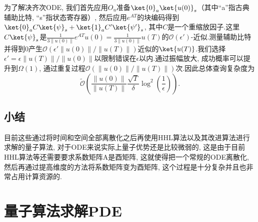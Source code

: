 为了解决齐次ODE, 我们首先应用$O_u$准备$\ket{0}_a\ket{u(0)}_s$（其中“a”指古典辅助比特, “s”指状态寄存器）, 然后应用$e^{AT}$的块编码得到$\ket{0}_a C \ket{\psi}_s + \ket{1}_a C' \ket{\psi'}_s$, 其中$C$是一个重缩放因子.这里$C \ket{\psi}_s$是$\frac{1}{3\|u(0)\|}e^{AT}u(0) = \frac{1}{3\|u(0)\|}u(T)$的$\mathcal{O}(\epsilon')$-近似.测量辅助比特并得到$0$产生$\mathcal{O}(\epsilon'\|u(0)\|/\|u(T)\|)$近似的$\ket{u(T)}$.我们选择$\epsilon' = \epsilon \|u(T)\|/\|u(0)\|$以限制错误在$\epsilon$以内.通过振幅放大, 成功概率可以提升到$\Omega(1)$, 通过重复过程$\mathcal{O}(\|u(0)\|/\|u(T)\|)$次.因此总体查询复杂度为
\begin{equation}
	\widetilde{\mathcal{O}}\left(\frac{\|u(0)\|}{\|u(T)\|} \frac{\sqrt{T}}{\delta}\log^2\left(\frac{1}{\epsilon}\right) \right). 
\end{equation}
\subsection{小结}
目前这些通过将时间和空间全部离散化之后再使用HHL算法以及其改进算法进行求解的量子算法, 对于ODE来说实际上量子优势还是比较微弱的, 这是由于目前HHL算法等还需要要求系数矩阵A是酉矩阵, 这就使得把一个常规的ODE离散化, 然后再通过提高维度的方法将系数矩阵变为酉矩阵, 这个过程是十分复杂并且也非常占用计算资源的.

\section{量子算法求解PDE}
